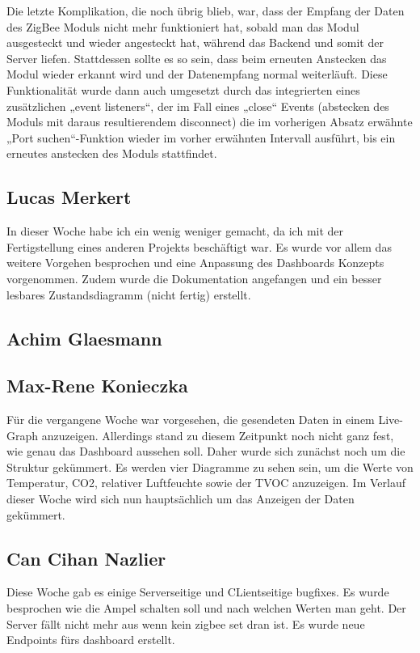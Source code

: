\documentclass[]{article}
\begin{document}
Die letzte Komplikation, die noch übrig blieb, war, dass der Empfang der Daten des ZigBee Moduls nicht mehr funktioniert hat, sobald man das Modul ausgesteckt und wieder angesteckt hat, während das Backend und somit der Server liefen. Stattdessen sollte es so sein, dass beim erneuten Anstecken das Modul wieder erkannt wird und der Datenempfang normal weiterläuft. Diese Funktionalität wurde dann auch umgesetzt durch das integrierten eines zusätzlichen „event listeners“, der im Fall eines „close“ Events (abstecken des Moduls mit daraus resultierendem disconnect) die im vorherigen Absatz erwähnte „Port suchen“-Funktion wieder im vorher erwähnten Intervall ausführt, bis ein erneutes anstecken des Moduls stattfindet.


\subsection{Lucas Merkert}
In dieser Woche habe ich ein wenig weniger gemacht, da ich mit der Fertigstellung eines anderen Projekts beschäftigt war. Es wurde vor allem das weitere Vorgehen besprochen und eine Anpassung des Dashboards Konzepts vorgenommen. Zudem wurde die Dokumentation angefangen und ein besser lesbares Zustandsdiagramm (nicht fertig) erstellt.

\subsection{Achim Glaesmann}


\subsection{Max-Rene Konieczka}
Für die vergangene Woche war vorgesehen, die gesendeten Daten in einem Live-Graph anzuzeigen. Allerdings stand zu diesem Zeitpunkt noch nicht ganz fest, wie genau das Dashboard aussehen soll. Daher wurde sich zunächst noch um die Struktur gekümmert. Es werden vier Diagramme zu sehen sein, um die Werte von Temperatur, CO2, relativer Luftfeuchte sowie der TVOC anzuzeigen. Im Verlauf dieser Woche wird sich nun hauptsächlich um das Anzeigen der Daten gekümmert. 

\subsection{Can Cihan Nazlier}
Diese Woche gab es einige Serverseitige und CLientseitige bugfixes. Es wurde besprochen wie die Ampel schalten soll und nach welchen Werten man geht. Der Server fällt nicht mehr aus wenn kein zigbee set dran ist. Es wurde neue Endpoints fürs dashboard erstellt.

\end{document}
